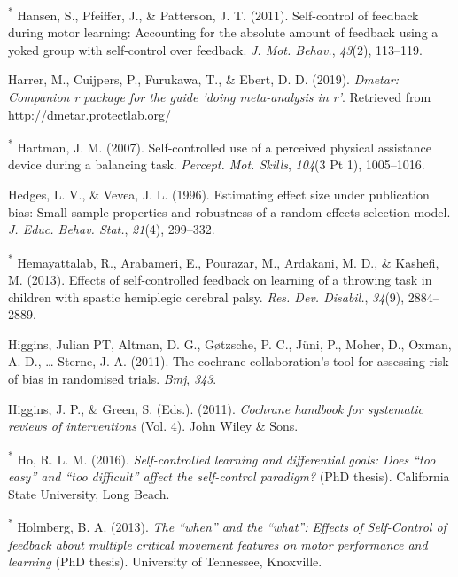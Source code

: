 \documentclass[
  english,
  man,floatsintext]{apa7}
\newlength{\cslhangindent}
\newlength{\cslentryspacingunit} %
\newenvironment{CSLReferences}[2] %
 {%
  \setlength{\parindent}{0pt}
  \ifodd #1
  \let\oldpar\par
  \def\par{\hangindent=\cslhangindent\oldpar}
  \fi
  \setlength{\parskip}{#2\cslentryspacingunit}
 }%
 {}
\begin{document}
\begin{CSLReferences}{1}{0}
\leavevmode{}%
\textsuperscript{*} Hansen, S., Pfeiffer, J., \& Patterson, J. T. (2011). Self-control of feedback during motor learning: Accounting for the absolute amount of feedback using a yoked group with self-control over feedback. \emph{J. Mot. Behav.}, \emph{43}(2), 113--119.

\leavevmode{}%
Harrer, M., Cuijpers, P., Furukawa, T., \& Ebert, D. D. (2019). \emph{Dmetar: Companion r package for the guide 'doing meta-analysis in r'}. Retrieved from \url{http://dmetar.protectlab.org/}

\leavevmode{}%
\textsuperscript{*} Hartman, J. M. (2007). Self-controlled use of a perceived physical assistance device during a balancing task. \emph{Percept. Mot. Skills}, \emph{104}(3 Pt 1), 1005--1016.

\leavevmode{}%
Hedges, L. V., \& Vevea, J. L. (1996). Estimating effect size under publication bias: Small sample properties and robustness of a random effects selection model. \emph{J. Educ. Behav. Stat.}, \emph{21}(4), 299--332.

\leavevmode{}%
\textsuperscript{*} Hemayattalab, R., Arabameri, E., Pourazar, M., Ardakani, M. D., \& Kashefi, M. (2013). Effects of self-controlled feedback on learning of a throwing task in children with spastic hemiplegic cerebral palsy. \emph{Res. Dev. Disabil.}, \emph{34}(9), 2884--2889.

\leavevmode{}%
Higgins, Julian PT, Altman, D. G., Gøtzsche, P. C., Jüni, P., Moher, D., Oxman, A. D., \ldots{} Sterne, J. A. (2011). The cochrane collaboration's tool for assessing risk of bias in randomised trials. \emph{Bmj}, \emph{343}.

\leavevmode{}%
Higgins, J. P., \& Green, S. (Eds.). (2011). \emph{Cochrane handbook for systematic reviews of interventions} (Vol. 4). John Wiley \& Sons.

\leavevmode{}%
\textsuperscript{*} Ho, R. L. M. (2016). \emph{Self-controlled learning and differential goals: Does {``too easy''} and {``too difficult''} affect the self-control paradigm?} (PhD thesis). California State University, Long Beach.

\leavevmode{}%
\textsuperscript{*} Holmberg, B. A. (2013). \emph{The {``when''} and the {``what''}: Effects of {Self-Control} of feedback about multiple critical movement features on motor performance and learning} (PhD thesis). University of Tennessee, Knoxville.


\end{CSLReferences}
\end{document}
